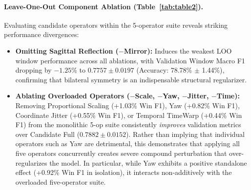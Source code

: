 \documentclass[runningheads]{llncs}
\begin{document}
\paragraph{Leave-One-Out Component Ablation (Table~\ref{tab:table2}).}
Evaluating candidate operators within the 5-operator suite reveals striking performance divergences:
\begin{itemize}
    \item \textbf{Omitting Sagittal Reflection ($-$Mirror):} Induces the weakest LOO window performance across all ablations, with Validation Window Macro F1 dropping by $-1.25\%$ to $0.7757 \pm 0.0197$ (Accuracy: 78.78\% $\pm$ 1.44\%), confirming that bilateral symmetry is an indispensable structural regularizer.
    \item \textbf{Ablating Overloaded Operators ($-$Scale, $-$Yaw, $-$Jitter, $-$Time):} Removing Proportional Scaling (+1.03\% Win F1), Yaw (+0.82\% Win F1), Coordinate Jitter (+0.55\% Win F1), or Temporal TimeWarp (+0.44\% Win F1) from the monolithic 5-op suite consistently \textit{improves} validation metrics over Candidate Full ($0.7882 \pm 0.0152$). Rather than implying that individual operators such as Yaw are detrimental, this demonstrates that applying all five operators concurrently creates severe compound perturbation that over-regularizes the model. In particular, while Yaw exhibits a positive standalone effect (+0.92\% Win F1 in isolation), it interacts non-additively with the overloaded five-operator suite.
\end{itemize}
\end{document}
